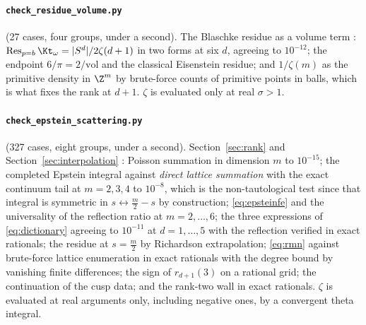 \paragraph{\texttt{check\_residue\_volume.py}} (27 cases, four groups, under a
second). The Blaschke residue as a volume term \cite{WhichDimension}:
$\operatorname{Res}_{p=b}\Kt_\omega=\lvert S^{d}\rvert/2\zeta(d+1)$ in two forms
at six $d$, agreeing to $10^{-12}$; the endpoint $6/\pi=2/\mathrm{vol}$ and the
classical Eisenstein residue; and $1/\zeta(m)$ as the primitive density in
$\Z^{m}$ by brute-force counts of primitive points in balls, which is what fixes
the rank at $d+1$. $\zeta$ is evaluated only at real $\sigma>1$.

\paragraph{\texttt{check\_epstein\_scattering.py}} (327 cases, eight groups,
under a second). Section~\ref{sec:rank} and Section~\ref{sec:interpolation}
\cite{RankNote}: Poisson summation in dimension $m$ to $10^{-15}$; the completed
Epstein integral against \emph{direct lattice summation} with the exact continuum
tail at $m=2,3,4$ to $10^{-8}$, which is the non-tautological test since that
integral is symmetric in $s\leftrightarrow\frac m2-s$ by construction;
\eqref{eq:epsteinfe} and the universality of the reflection ratio at
$m=2,\dots,6$; the three expressions of \eqref{eq:dictionary} agreeing to
$10^{-11}$ at $d=1,\dots,5$ with the reflection verified in exact rationals; the
residue at $s=\frac m2$ by Richardson extrapolation; \eqref{eq:rmn} against
brute-force lattice enumeration in exact rationals with the degree bound by
vanishing finite differences; the sign of $r_{d+1}(3)$ on a rational grid; the
continuation of the cusp data; and the rank-two wall in exact rationals. $\zeta$
is evaluated at real arguments only, including negative ones, by a convergent
theta integral.

